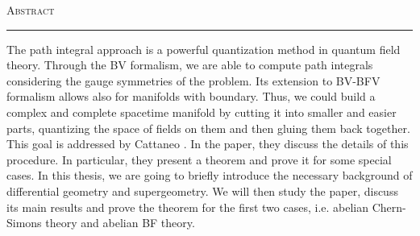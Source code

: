 \thispagestyle{plain}
\vspace*{3cm}
\begin{center}
    \textsc{\LARGE Abstract}

    \rule{5cm}{0.4pt}

    \vspace{1cm}
\end{center}
The path integral approach is a powerful quantization method in quantum field theory.
Through the BV formalism, we are able to compute path integrals considering the gauge symmetries of the problem.
Its extension to BV-BFV formalism allows also for manifolds with boundary.
Thus, we could build a complex and complete spacetime manifold by cutting it into smaller and easier parts, quantizing the space of fields on them and then gluing them back together.
This goal is addressed by Cattaneo \etal \cite{Gluing_BV-BFV}.
In the paper, they discuss the details of this procedure.
In particular, they present a theorem and prove it for some special cases.
In this thesis, we are going to briefly introduce the necessary background of differential geometry and supergeometry.
We will then study the paper, discuss its main results and prove the theorem for the first two cases, i.e. abelian Chern-Simons theory and abelian BF theory.

\restoregeometry
\newpage